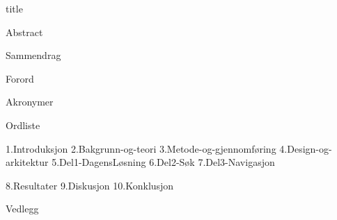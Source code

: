 \documentclass{article}
\begin{document}
{title}

\frontmatter

{\compactlists

{Abstract}
\clearpage

{Sammendrag}
\clearpage

{Forord}
\clearpage

{}
\tableofcontents
\clearpage

{}
\listoffigures
\clearpage

{}
\listoftables
\clearpage

{}
\lstlistoflistings
\clearpage

{Akronymer}
\clearpage

{Ordliste}
\clearpage

}
\mainmatter

{1.Introduksjon}
{2.Bakgrunn-og-teori}
{3.Metode-og-gjennomføring}
{4.Design-og-arkitektur}
{5.Del1-DagensLøsning}
{6.Del2-Søk}
{7.Del3-Navigasjon}

{8.Resultater}
{9.Diskusjon}
{10.Konklusjon}



\clearpage
\printbibliography[heading=bibintoc, title={Bibliografi}]
\clearpage


\startvedlegg
{Vedlegg}
\end{document}
